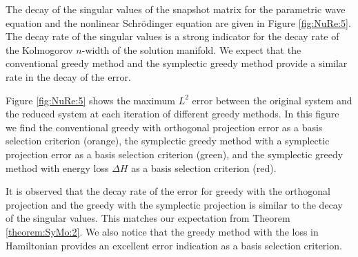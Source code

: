 The decay of the singular values of the snapshot matrix for the parametric wave equation and the nonlinear Schr\"odinger equation are given in Figure \ref{fig:NuRe:5}. The decay rate of the singular values is a strong indicator for the decay rate of the Kolmogorov $n$-width of the solution manifold. We expect that the conventional greedy method and the symplectic greedy method provide a similar rate in the decay of the error.
	
Figure \ref{fig:NuRe:5} shows the maximum $L^2$ error between the original system and the reduced system at each iteration of different greedy methods. In this figure we find the conventional greedy with orthogonal projection error as a basis selection criterion (orange), the symplectic greedy method with a symplectic projection error as a basis selection criterion (green), and the symplectic greedy method with energy loss $\Delta H$ as a basis selection criterion (red).

It is observed that the decay rate of the error for greedy with the orthogonal projection and the greedy with the symplectic projection is similar to the decay of the singular values. This matches our expectation from Theorem \ref{theorem:SyMo:2}. We also notice that the greedy method with the loss in Hamiltonian provides an excellent error indication as a basis selection criterion.


